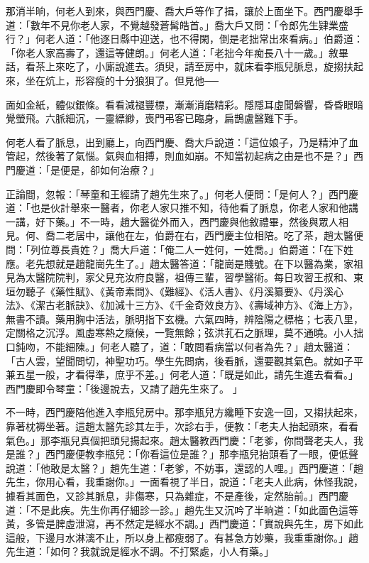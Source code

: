 那消半晌，何老人到來，與西門慶、喬大戶等作了揖，讓於上面坐下。西門慶舉手道：「數年不見你老人家，不覺越發蒼髯皓首。」喬大戶又問：「令郎先生肄業盛行？」何老人道：「他逐日縣中迎送，也不得閑，倒是老拙常出來看病。」伯爵道：「你老人家高壽了，還這等健朗。」何老人道：「老拙今年痴長八十一歲。」敘畢話，看茶上來吃了，小廝說進去。須臾，請至房中，就床看李瓶兒脈息，旋搊扶起來，坐在炕上，形容瘦的十分狼狽了。但見他──

面如金紙，體似銀條。看看減褪豐標，漸漸消磨精彩。隱隱耳虛聞磐響，昏昏眼暗覺螢飛。六脈細沉，一靈縹緲，喪門弔客已臨身，扁鵲盧醫難下手。

何老人看了脈息，出到廳上，向西門慶、喬大戶說道：「這位娘子，乃是精沖了血管起，然後著了氣惱。氣與血相搏，則血如崩。不知當初起病之由是也不是？」西門慶道：「是便是，卻如何治療？」

正論間，忽報：「琴童和王經請了趙先生來了。」何老人便問：「是何人？」西門慶道：「也是伙計舉來一醫者，你老人家只推不知，待他看了脈息，你老人家和他講一講，好下藥。」不一時，趙大醫從外而入，西門慶與他敘禮畢，然後與眾人相見。何、喬二老居中，讓他在左，伯爵在右，西門慶主位相陪。吃了茶，趙太醫便問：「列位尊長貴姓？」喬大戶道：「俺二人一姓何，一姓喬。」伯爵道：「在下姓應。老先想就是趙龍崗先生了。」趙太醫答道：「龍崗是賤號。在下以醫為業，家祖見為太醫院院判，家父見充汝府良醫，祖傳三輩，習學醫術。每日攻習王叔和、東垣勿聽子《藥性賦》、《黃帝素問》、《難經》、《活人書》、《丹溪纂要》、《丹溪心法》、《潔古老脈訣》、《加減十三方》、《千金奇效良方》、《壽域神方》、《海上方》，無書不讀。藥用胸中活法，脈明指下玄機。六氣四時，辨陰陽之標格；七表八里，定關格之沉浮。風虛寒熱之癥候，一覽無餘；弦洪芤石之脈理，莫不通曉。小人拙口鈍吻，不能細陳。」何老人聽了，道：「敢問看病當以何者為先？」趙太醫道：「古人雲，望聞問切，神聖功巧。學生先問病，後看脈，還要觀其氣色。就如子平兼五星一般，才看得準，庶乎不差。」何老人道：「既是如此，請先生進去看看。」西門慶即令琴童：「後邊說去，又請了趙先生來了。 」

不一時，西門慶陪他進入李瓶兒房中。那李瓶兒方纔睡下安逸一回，又搊扶起來，靠著枕褥坐著。這趙太醫先診其左手，次診右手，便教：「老夫人抬起頭來，看看氣色。」那李瓶兒真個把頭兒揚起來。趙太醫教西門慶：「老爹，你問聲老夫人，我是誰？」西門慶便教李瓶兒：「你看這位是誰？」那李瓶兒抬頭看了一眼，便低聲說道：「他敢是太醫？」趙先生道：「老爹，不妨事，還認的人哩。」西門慶道：「趙先生，你用心看，我重謝你。」一面看視了半日，說道：「老夫人此病，休怪我說，據看其面色，又診其脈息，非傷寒，只為雜症，不是產後，定然胎前。」西門慶道：「不是此疾。先生你再仔細診一診。」趙先生又沉吟了半晌道：「如此面色這等黃，多管是脾虛泄瀉，再不然定是經水不調。」西門慶道：「實說與先生，房下如此這般，下邊月水淋漓不止，所以身上都瘦弱了。有甚急方妙藥，我重重謝你。」趙先生道：「如何？我就說是經水不調。不打緊處，小人有藥。」


